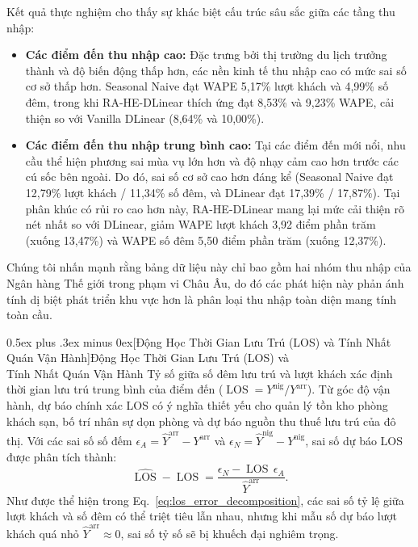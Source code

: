 \documentclass[10pt,journal,compsoc]{IEEEtran}
\makeatletter
\def\subsection{\@startsection{subsection}{2}{\z@}{-1.8ex plus -0.6ex minus -0.3ex}%
{0.5ex plus .3ex minus 0ex}{\normalfont\normalsize\rmfamily\bfseries}}
\makeatother
\begin{document}
Kết quả thực nghiệm cho thấy sự khác biệt cấu trúc sâu sắc giữa các tầng thu nhập:
\begin{itemize}
    \item \textbf{Các điểm đến thu nhập cao:} Đặc trưng bởi thị trường du lịch trưởng thành và độ biến động thấp hơn, các nền kinh tế thu nhập cao có mức sai số cơ sở thấp hơn. Seasonal Naive đạt WAPE 5,17\% lượt khách và 4,99\% số đêm, trong khi RA-HE-DLinear thích ứng đạt 8,53\% và 9,23\% WAPE, cải thiện so với Vanilla DLinear (8,64\% và 10,00\%).
    \item \textbf{Các điểm đến thu nhập trung bình cao:} Tại các điểm đến mới nổi, nhu cầu thể hiện phương sai mùa vụ lớn hơn và độ nhạy cảm cao hơn trước các cú sốc bên ngoài. Do đó, sai số cơ sở cao hơn đáng kể (Seasonal Naive đạt 12,79\% lượt khách / 11,34\% số đêm, và DLinear đạt 17,39\% / 17,87\%). Tại phân khúc có rủi ro cao hơn này, RA-HE-DLinear mang lại mức cải thiện rõ nét nhất so với DLinear, giảm WAPE lượt khách 3,92 điểm phần trăm (xuống 13,47\%) và WAPE số đêm 5,50 điểm phần trăm (xuống 12,37\%).
\end{itemize}
Chúng tôi nhấn mạnh rằng bảng dữ liệu này chỉ bao gồm hai nhóm thu nhập của Ngân hàng Thế giới trong phạm vi Châu Âu, do đó các phát hiện này phản ánh tính dị biệt phát triển khu vực hơn là phân loại thu nhập toàn diện mang tính toàn cầu.



\subsection[Động Học Thời Gian Lưu Trú (LOS) và Tính Nhất Quán Vận Hành]{Động Học Thời Gian Lưu Trú (LOS) và\\Tính Nhất Quán Vận Hành}
\label{sec:los_analysis}
Tỷ số giữa số đêm lưu trú và lượt khách xác định thời gian lưu trú trung bình của điểm đến ($\operatorname{LOS} = Y^{\text{nig}} / Y^{\text{arr}}$). Từ góc độ vận hành, dự báo chính xác LOS có ý nghĩa thiết yếu cho quản lý tồn kho phòng khách sạn, bố trí nhân sự dọn phòng và dự báo nguồn thu thuế lưu trú của đô thị. Với các sai số số đếm $\epsilon_A = \hat{Y}^{\text{arr}} - Y^{\text{arr}}$ và $\epsilon_N = \hat{Y}^{\text{nig}} - Y^{\text{nig}}$, sai số dự báo LOS được phân tích thành:
\begin{equation}
\widehat{\operatorname{LOS}}-\operatorname{LOS}
=\frac{\epsilon_N-\operatorname{LOS}\,\epsilon_A}{\hat{Y}^{\mathrm{arr}}}.
\label{eq:los_error_decomposition}
\end{equation}
Như được thể hiện trong Eq.~\eqref{eq:los_error_decomposition}, các sai số tỷ lệ giữa lượt khách và số đêm có thể triệt tiêu lẫn nhau, nhưng khi mẫu số dự báo lượt khách quá nhỏ $\hat{Y}^{\text{arr}} \approx 0$, sai số tỷ số sẽ bị khuếch đại nghiêm trọng.
\end{document}
